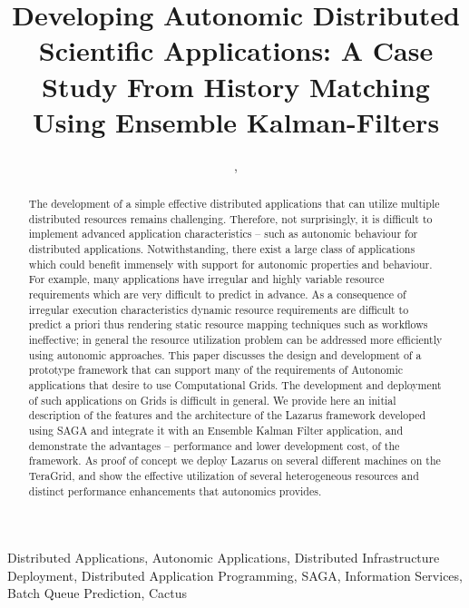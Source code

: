 \documentclass[conference,final]{IEEEtran}
\begin{document}
\title{\large Developing Autonomic Distributed Scientific
  Applications: A Case Study From History Matching Using Ensemble
  Kalman-Filters}
  
\author{,
    
}
\maketitle
 \begin{abstract}
   The development of a simple effective distributed applications that
   can utilize multiple distributed resources remains challenging.
   Therefore, not surprisingly, it is difficult to implement advanced
   application characteristics -- such as autonomic behaviour for
   distributed applications. Notwithstanding, there exist a large
   class of applications which could benefit immensely with support
   for autonomic properties and behaviour.  For example, many
   applications have irregular and highly variable resource
   requirements which are very difficult to predict in advance.  As a
   consequence of irregular execution characteristics dynamic resource
   requirements are difficult to predict a priori thus rendering
   static resource mapping techniques such as workflows ineffective;
   in general the resource utilization problem can be addressed more
   efficiently using autonomic approaches.  This paper discusses the
   design and development of a prototype framework that can support
   many of the requirements of Autonomic applications that desire to
   use Computational Grids.  The development and deployment of such
   applications on Grids is difficult in general.  We provide here an
   initial description of the features and the architecture of the
   Lazarus framework developed using SAGA and integrate it with an
   Ensemble Kalman Filter application, and demonstrate the advantages
   -- performance and lower development cost, of the framework.  As
   proof of concept we deploy Lazarus on several different machines on
   the TeraGrid, and show the effective utilization of several
   heterogeneous resources and distinct performance enhancements that
   autonomics provides.
 \end{abstract}
 \begin{keywords}
   Distributed Applications, Autonomic Applications, Distributed
   Infrastructure Deployment, Distributed Application Programming,
   SAGA, Information Services, Batch Queue Prediction, Cactus
 \end{keywords}
\end{document}
